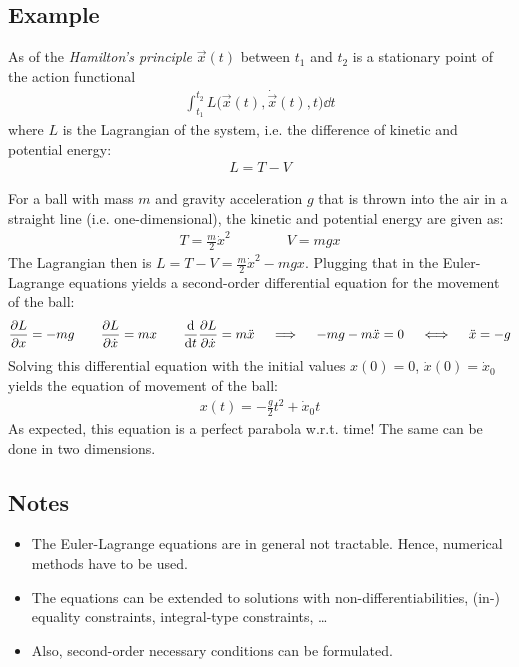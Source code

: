 		\subsection{Example}
			\label{subsec:ballExample}

			As of the \emph{Hamilton's principle} \(\vec{x}(t)\) between \(t_1\) and \(t_2\) is a stationary point of the action functional
			\begin{align*}
				\int_{t_1}^{t_2} \! L\big(\vec{x}(t), \dot{\vec{x}}(t), t\big) \dd{t}
			\end{align*}
			where \(L\) is the Lagrangian of the system, i.e. the difference of kinetic and potential energy:
			\begin{align*}
				L = T - V
			\end{align*}

			For a ball with mass \(m\) and gravity acceleration \(g\) that is thrown into the air in a straight line (i.e. one-dimensional), the kinetic and potential energy are given as:
			\begin{align*}
				T = \frac{m}{2} \dot{x}^2 \qquad\qquad V = mgx
			\end{align*}
			The Lagrangian then is \( L = T - V = \frac{m}{2} \dot{x}^2 - mgx \). Plugging that in the Euler-Lagrange equations yields a second-order differential equation for the movement of the ball:
			\begin{align*}
				\pdv{L}{x} = -mg \qquad \pdv{L}{\dot{x}} = mx \qquad \dv{t} \pdv{L}{\dot{x}} = m\ddot{x} \quad\implies\quad -mg - m\ddot{x} = 0 \quad\iff\quad \ddot{x} = -g
			\end{align*}
			Solving this differential equation with the initial values \( x(0) = 0 \), \( \dot{x}(0) = \dot{x}_0 \) yields the equation of movement of the ball:
			\begin{align*}
				x(t) = -\frac{g}{2} t^2 + \dot{x}_0 t
			\end{align*}
			As expected, this equation is a perfect parabola w.r.t. time! The same can be done in two dimensions.

		\subsection{Notes}
			\begin{itemize}
				\item The Euler-Lagrange equations are in general not tractable. Hence, numerical methods have to be used.
				\item The equations can be extended to solutions with non-differentiabilities, (in-) equality constraints, integral-type constraints, \dots
				\item Also, second-order necessary conditions can be formulated.
			\end{itemize}

